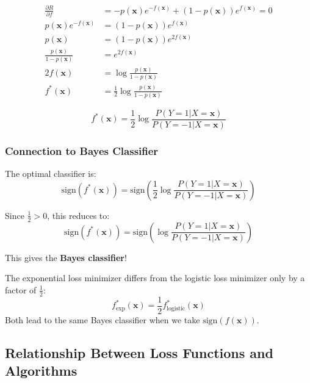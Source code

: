 \documentclass[12pt,a4paper]{article}
\begin{document}
\begin{align}
\frac{\partial R}{\partial f} &= -p(\mathbf{x}) e^{-f(\mathbf{x})} + (1-p(\mathbf{x})) e^{f(\mathbf{x})} = 0 \\
p(\mathbf{x}) e^{-f(\mathbf{x})} &= (1-p(\mathbf{x})) e^{f(\mathbf{x})} \\
p(\mathbf{x}) &= (1-p(\mathbf{x})) e^{2f(\mathbf{x})} \\
\frac{p(\mathbf{x})}{1-p(\mathbf{x})} &= e^{2f(\mathbf{x})} \\
2f(\mathbf{x}) &= \log \frac{p(\mathbf{x})}{1-p(\mathbf{x})} \\
f^*(\mathbf{x}) &= \frac{1}{2} \log \frac{p(\mathbf{x})}{1-p(\mathbf{x})}
\end{align}

\begin{equation}
\boxed{f^*(\mathbf{x}) = \frac{1}{2} \log \frac{P(Y = 1|X = \mathbf{x})}{P(Y = -1|X = \mathbf{x})}}
\end{equation}

\subsubsection{Connection to Bayes Classifier}

The optimal classifier is:
\begin{equation}
\text{sign}(f^*(\mathbf{x})) = \text{sign}\left(\frac{1}{2} \log \frac{P(Y = 1|X = \mathbf{x})}{P(Y = -1|X = \mathbf{x})}\right)
\end{equation}

Since $\frac{1}{2} > 0$, this reduces to:
\begin{equation}
\text{sign}(f^*(\mathbf{x})) = \text{sign}\left(\log \frac{P(Y = 1|X = \mathbf{x})}{P(Y = -1|X = \mathbf{x})}\right)
\end{equation}

This gives the \textbf{Bayes classifier}! 

\begin{tcolorbox}[colback=red!5!white,colframe=red!75!black,title=Key Result]
The exponential loss minimizer differs from the logistic loss minimizer only by a factor of $\frac{1}{2}$:
$$f^*_{\text{exp}}(\mathbf{x}) = \frac{1}{2} f^*_{\text{logistic}}(\mathbf{x})$$
Both lead to the same Bayes classifier when we take $\text{sign}(f(\mathbf{x}))$.
\end{tcolorbox}

\subsection{Relationship Between Loss Functions and Algorithms}
\end{document}
